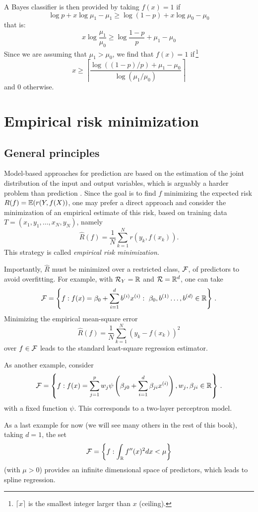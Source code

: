 A Bayes classifier is then provided by taking $f(x) = 1$ if
\[
\log p + x\log \mu_1 - \mu_1 \geq \log(1-p) + x\log\mu_0 - \mu_0
\]
that is:
\[
x \log\frac{\mu_1}{\mu_0} \geq \log \frac{1-p}{p} + \mu_1 - \mu_0
\]
Since we are assuming that $\mu_1 > \mu_0$, we find that $f(x) = 1$ if\,\footnote{$\lceil x \rceil$ is the smallest integer larger than $x$ (ceiling).}
\[
x \geq \left\lceil \frac{\log ((1-p)/p) +\mu_1 -\mu_0}{\log(\mu_1/\mu_0)}\right\rceil
\]
and 0 otherwise.


\section{Empirical risk minimization}
\label{sec:emp.risk}
\subsection{General principles}
Model-based approaches for prediction are based on the estimation of the joint distribution of the input and output variables, which is arguably a harder problem than prediction \citep{vapnik1998statistical}. Since the goal is to find $f$ minimizing the expected risk $R(f) = \bm{\mathbb E}(r(Y, f(X))$, one may prefer a direct approach and consider the minimization of an empirical estimate of this risk, based on training data $T  = (x_1, y_1, \ldots, x_N, y_N)$, namely
\[
\hat R(f) = \frac{1}{N} \sum_{k=1}^N r(y_k, f(x_k)).
\]
This strategy is  called {\em empirical risk minimization.}

Importantly, $\hat R$ must be minimized over a restricted class, ${\mathcal F}$, of predictors to avoid overfitting. 
For example,
with ${\mathcal R}_Y={\mathbb{R}}$ and ${\mathcal R} = {\mathbb{R}}^{d}$, one can take
\[
{\mathcal F} = \left\{ f: f(x) = \beta_0 + \sum_{i=1}^d b^{(i)}  x^{(i)}: \ \beta_0, b^{(1)}  
\ldots, b^{(d)} \in{\mathbb{R}} \right\}\,.
\]
Minimizing the empirical mean-square error 
\[
\hat R(f)  = \frac1N\sum_{k=1}^{N} (y_{k} - f(x_{k}))^{2}
\]
over $f\in {\mathcal F}$ leads to the standard least-square regression estimator.


As another example, consider
\[
{\mathcal F} = \left\{ f: f(x) = \sum_{j=1}^p w_j \psi\left(\beta_{j0} + \sum_{i=1}^d
\beta_{ji} x^{(i)} \right), w_j, \beta_{ji}\in{\mathbb{R}} \right\}\,.
\]
with a fixed function $\psi$. This corresponds to a two-layer perceptron model.

As a last example for now (we will see many others in the rest of this book), taking $d=1$, the set
\[
{\mathcal F} = \left\{ f: \int_{{\mathbb{R}}} f''(x)^{2} dx < \mu \right\}
\]
(with $\mu>0$) provides an infinite dimensional space of predictors, 
which leads to spline regression.



